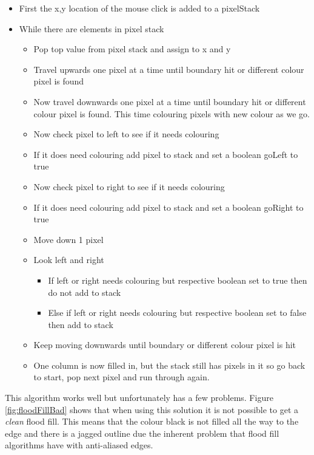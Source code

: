 \documentclass[12pt,a4paper]{report}
\begin{document}
\begin{itemize}
   \item  First the x,y location of the mouse click is added to a pixelStack
   \item While there are elements in pixel stack
   \begin{itemize}
     \item  Pop top value from pixel stack and assign to x and y
\item  Travel upwards one pixel at a time until boundary hit or different colour pixel is found
\item  Now travel downwards one pixel at a time until boundary hit or different colour pixel is found. This time colouring pixels with new colour as we go.

\item  Now check pixel to left to see if it needs colouring
\item  If it does need colouring add pixel to stack and set a boolean goLeft to true

\item  Now check pixel to right to see if it needs colouring

\item  If it does need colouring add pixel to stack and set a boolean goRight to true

\item  Move down 1 pixel

\item  Look left and right

     \begin{itemize}
       \item  If left or right needs colouring but respective boolean set to true then do not add to stack
\item Else if left or right needs colouring but respective boolean set to false then add to stack
     \end{itemize}
     \item Keep moving downwards until boundary or different colour pixel is hit
\item One column is now filled in, but the stack still has pixels in it so go back to start, pop next pixel and run through again.

   \end{itemize}
 \end{itemize}
	

This algorithm works well but unfortunately has a few problems. Figure \ref{fig:floodFillBad} shows that when using this solution it is not possible to get a \textit{clean} flood fill. This means that the colour black is not filled all the way to the edge and there is a jagged outline due the inherent problem that flood fill algorithms have with anti-aliased edges.
\end{document}
